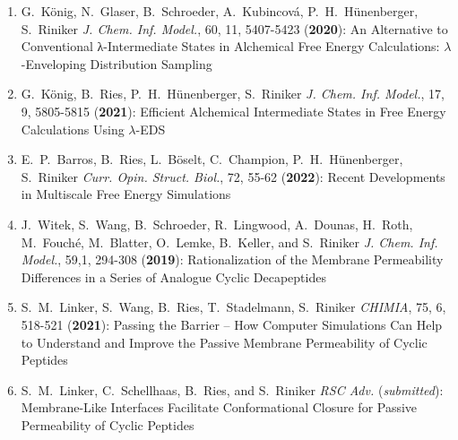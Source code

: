 \begin{enumerate}
    \item  G.\ K\"onig, N.\ Glaser, B.\ Schroeder, A.\ Kubincová, P.\ H.\ H\"unenberger, S.\ Riniker {\em J. Chem. Inf. Model.}, 60, 11, 5407-5423 ({\bf 2020}):
An Alternative to Conventional λ-Intermediate States in Alchemical Free Energy Calculations: $\lambda$-Enveloping Distribution Sampling
\\
    \item G.\ K\"onig, B.\ Ries, P.\ H.\ H\"unenberger, S.\ Riniker {\em J. Chem. Inf. Model.}, 17, 9, 5805-5815 ({\bf 2021}):
Efficient Alchemical Intermediate States in Free Energy Calculations Using  $\lambda$-EDS
\\
    \item E.\ P.\ Barros, B.\ Ries, L.\ B\"oselt, C.\ Champion, P.\ H.\ H\"unenberger, S.\ Riniker {\em Curr. Opin. Struct. Biol.}, 72, 55-62 ({\bf 2022}):
Recent Developments in Multiscale Free Energy Simulations
\\
    \item J.\ Witek, S.\ Wang, B.\ Schroeder, R.\ Lingwood, A.\ Dounas, H.\ Roth, M.\ Fouché, M.\ Blatter, O.\ Lemke, B.\ Keller, and S.\ Riniker {\em J. Chem. Inf. Model.}, 59,1, 294-308 ({\bf 2019}):
Rationalization of the Membrane Permeability Differences in a Series of Analogue Cyclic Decapeptides
\\
    \item S.\ M.\ Linker, S.\ Wang, B.\ Ries, T.\ Stadelmann, S.\ Riniker {\em CHIMIA}, 75, 6, 518-521 ({\bf 2021}): 
Passing the Barrier – How Computer Simulations Can Help to Understand and Improve the Passive Membrane Permeability of Cyclic Peptides
\\
    \item S.\ M.\ Linker, C.\ Schellhaas, B.\ Ries, and S.\ Riniker {\em RSC Adv.} ({\em submitted}):
Membrane-Like Interfaces Facilitate Conformational Closure for Passive Permeability of Cyclic Peptides

\end{enumerate}
